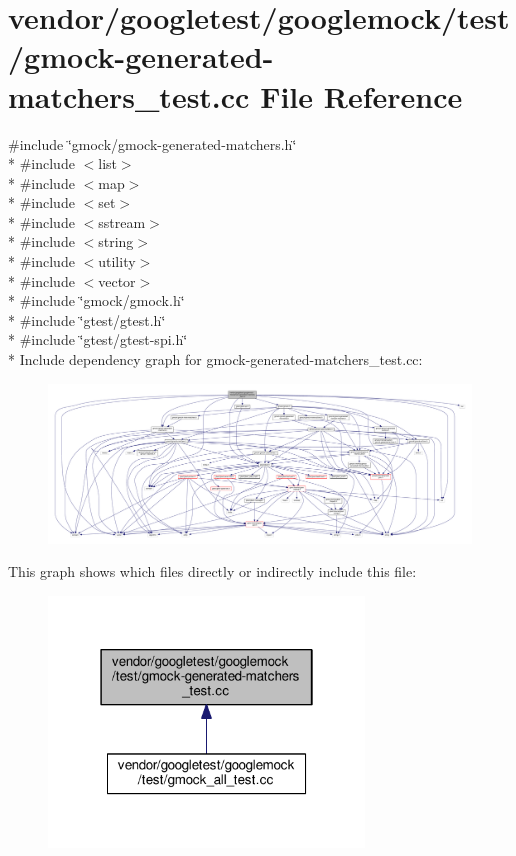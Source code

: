 \hypertarget{gmock-generated-matchers__test_8cc}{}\section{vendor/googletest/googlemock/test/gmock-\/generated-\/matchers\+\_\+test.cc File Reference}
\label{gmock-generated-matchers__test_8cc}
{\ttfamily \#include \char`\"{}gmock/gmock-\/generated-\/matchers.\+h\char`\"{}}\\*
{\ttfamily \#include $<$list$>$}\\*
{\ttfamily \#include $<$map$>$}\\*
{\ttfamily \#include $<$set$>$}\\*
{\ttfamily \#include $<$sstream$>$}\\*
{\ttfamily \#include $<$string$>$}\\*
{\ttfamily \#include $<$utility$>$}\\*
{\ttfamily \#include $<$vector$>$}\\*
{\ttfamily \#include \char`\"{}gmock/gmock.\+h\char`\"{}}\\*
{\ttfamily \#include \char`\"{}gtest/gtest.\+h\char`\"{}}\\*
{\ttfamily \#include \char`\"{}gtest/gtest-\/spi.\+h\char`\"{}}\\*
Include dependency graph for gmock-\/generated-\/matchers\+\_\+test.cc\+:
\nopagebreak
\begin{figure}[H]
\begin{center}
\leavevmode
\includegraphics[width=350pt]{gmock-generated-matchers__test_8cc__incl}
\end{center}
\end{figure}
This graph shows which files directly or indirectly include this file\+:
\nopagebreak
\begin{figure}[H]
\begin{center}
\leavevmode
\includegraphics[width=238pt]{gmock-generated-matchers__test_8cc__dep__incl}
\end{center}
\end{figure}
